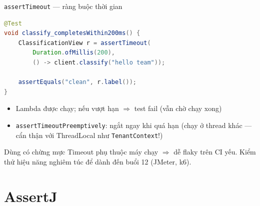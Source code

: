 \documentclass[aspectratio=169,12pt]{beamer}
\begin{document}
\begin{frame}[fragile,shrink=8]{\texttt{assertTimeout} --- ràng buộc thời gian}
\begin{lstlisting}[language=java]
@Test
void classify_completesWithin200ms() {
    ClassificationView r = assertTimeout(
        Duration.ofMillis(200),
        () -> client.classify("hello team"));

    assertEquals("clean", r.label());
}
\end{lstlisting}
  \vspace{0.2em}
  \begin{itemize}
    \item Lambda được chạy; nếu vượt hạn \(\Rightarrow\) test fail
          (vẫn chờ chạy xong)
    \item \texttt{assertTimeoutPreemptively}: ngắt ngay khi quá hạn
          (chạy ở thread khác --- cẩn thận với ThreadLocal như
          \texttt{TenantContext}!)
  \end{itemize}
  \begin{alertblock}{Dùng có chừng mực}
    Timeout phụ thuộc máy chạy \(\Rightarrow\) dễ flaky trên CI yếu.
    Kiểm thử hiệu năng nghiêm túc để dành đến buổi 12 (JMeter, k6).
  \end{alertblock}
\end{frame}

\section{AssertJ}
\end{document}
